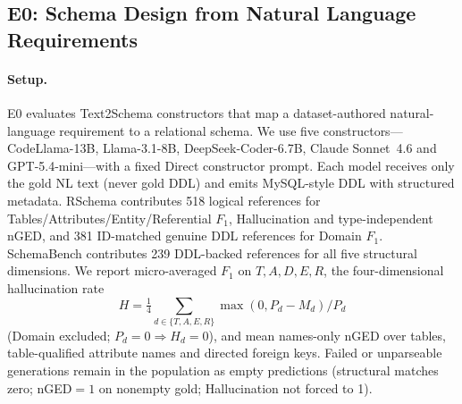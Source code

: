 
\subsection{E0: Schema Design from Natural Language Requirements}
\label{sec:e0}

\paragraph{Setup.}
E0 evaluates Text2Schema constructors that map a dataset-authored natural-language
requirement to a relational schema.
We use five constructors---CodeLlama-13B, Llama-3.1-8B, DeepSeek-Coder-6.7B,
Claude Sonnet~4.6 and GPT-5.4-mini---with a fixed Direct constructor prompt.
Each model receives only the gold NL text (never gold DDL) and emits MySQL-style DDL
with structured metadata.
RSchema contributes 518 logical references for Tables/Attributes/Entity/Referential
$F_1$, Hallucination and type-independent nGED, and 381 ID-matched genuine DDL
references for Domain $F_1$.
SchemaBench contributes 239 DDL-backed references for all five structural dimensions.
We report micro-averaged $F_1$ on $T,A,D,E,R$, the four-dimensional hallucination rate
\[
H=\tfrac14\sum_{d\in\{T,A,E,R\}} \max(0,P_d-M_d)/P_d
\]
(Domain excluded; $P_d{=}0\Rightarrow H_d{=}0$), and mean names-only nGED over tables,
table-qualified attribute names and directed foreign keys.
Failed or unparseable generations remain in the population as empty predictions
(structural matches zero; nGED${=}1$ on nonempty gold; Hallucination not forced to 1).

